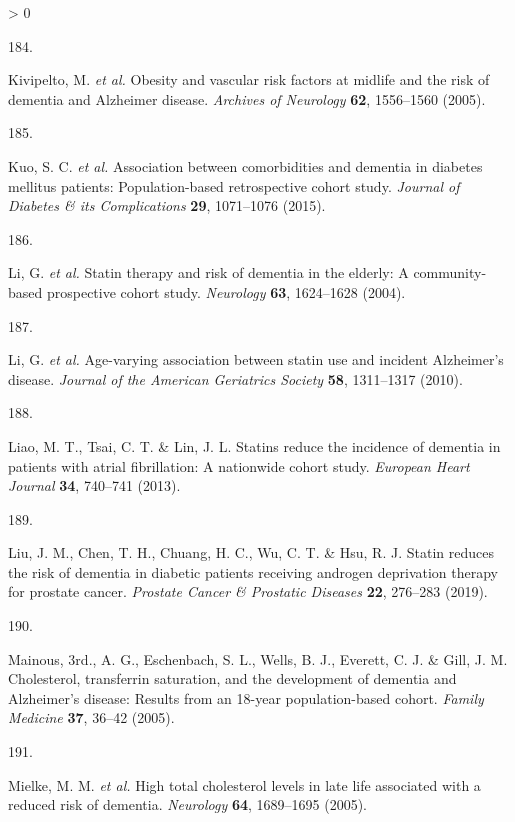\documentclass[a4paper, twoside]{templates/ociamthesis}
\newlength{\cslhangindent}
\newlength{\csllabelwidth}
\newenvironment{CSLReferences}[3] %
 {%
  \setlength{\parindent}{0pt}
  \ifodd #1 \everypar{\setlength{\hangindent}{\cslhangindent}}\ignorespaces\fi
  \ifnum #2 > 0
  \setlength{\parskip}{#2\baselineskip}
  \fi
 }%
 {}
\newcommand{\CSLLeftMargin}[1]{\parbox[t]{\maxof{\widthof{#1}}{\csllabelwidth}}{#1}}
\newcommand{\CSLRightInline}[1]{\parbox[t]{\linewidth - \csllabelwidth}{#1}}
\begin{document}
\begin{CSLReferences}{0}{0}
\leavevmode\hypertarget{ref-kivipelto2005a}{}%
\CSLLeftMargin{184. }
\CSLRightInline{Kivipelto, M. \emph{et al.} Obesity and vascular risk factors at midlife and the risk of dementia and {Alzheimer} disease. \emph{Archives of Neurology} \textbf{62}, 1556--1560 (2005).}

\leavevmode\hypertarget{ref-kuo2015}{}%
\CSLLeftMargin{185. }
\CSLRightInline{Kuo, S. C. \emph{et al.} Association between comorbidities and dementia in diabetes mellitus patients: Population-based retrospective cohort study. \emph{Journal of Diabetes \& its Complications} \textbf{29}, 1071--1076 (2015).}

\leavevmode\hypertarget{ref-li2004}{}%
\CSLLeftMargin{186. }
\CSLRightInline{Li, G. \emph{et al.} Statin therapy and risk of dementia in the elderly: A community-based prospective cohort study. \emph{Neurology} \textbf{63}, 1624--1628 (2004).}

\leavevmode\hypertarget{ref-li2010}{}%
\CSLLeftMargin{187. }
\CSLRightInline{Li, G. \emph{et al.} Age-varying association between statin use and incident {Alzheimer}'s disease. \emph{Journal of the American Geriatrics Society} \textbf{58}, 1311--1317 (2010).}

\leavevmode\hypertarget{ref-liao2013}{}%
\CSLLeftMargin{188. }
\CSLRightInline{Liao, M. T., Tsai, C. T. \& Lin, J. L. Statins reduce the incidence of dementia in patients with atrial fibrillation: A nationwide cohort study. \emph{European Heart Journal} \textbf{34}, 740--741 (2013).}

\leavevmode\hypertarget{ref-liu2019a}{}%
\CSLLeftMargin{189. }
\CSLRightInline{Liu, J. M., Chen, T. H., Chuang, H. C., Wu, C. T. \& Hsu, R. J. Statin reduces the risk of dementia in diabetic patients receiving androgen deprivation therapy for prostate cancer. \emph{Prostate Cancer \& Prostatic Diseases} \textbf{22}, 276--283 (2019).}

\leavevmode\hypertarget{ref-mainousa.g.2005}{}%
\CSLLeftMargin{190. }
\CSLRightInline{Mainous, 3rd., A. G., Eschenbach, S. L., Wells, B. J., Everett, C. J. \& Gill, J. M. Cholesterol, transferrin saturation, and the development of dementia and {Alzheimer}'s disease: Results from an 18-year population-based cohort. \emph{Family Medicine} \textbf{37}, 36--42 (2005).}

\leavevmode\hypertarget{ref-mielke2005a}{}%
\CSLLeftMargin{191. }
\CSLRightInline{Mielke, M. M. \emph{et al.} High total cholesterol levels in late life associated with a reduced risk of dementia. \emph{Neurology} \textbf{64}, 1689--1695 (2005).}


\end{CSLReferences}
\end{document}
